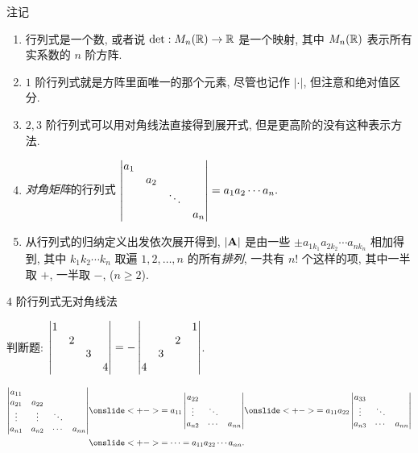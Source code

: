 \begin{frame}{注记}
	\onslide<+->
	\begin{enumerate}
		\item 行列式是一个数, 或者说 $\det:M_n({\mathbb{R}})\to{\mathbb{R}}$ 是一个映射, 其中 $M_n({\mathbb{R}})$ 表示所有实系数的 $n$ 阶方阵.
		\item $1$ 阶行列式就是方阵里面唯一的那个元素, 尽管也记作 $|\cdot|$, 但注意和绝对值区分.
		\item $2,3$ 阶行列式可以用对角线法直接得到展开式, 但是更高阶的没有这种表示方法.
		\item \emph{对角矩阵}的行列式
		$\left|\begin{matrix}
			a_1&&&\\
			&a_2&&\\
			&&\ddots&\\
			&&&a_n
		\end{matrix}\right|=a_1a_2\cdots a_n.$
		\item 从行列式的归纳定义出发依次展开得到, $|{\mathbf{A}}|$ 是由一些 $\pm a_{1 k_1}a_{2 k_2}\cdots a_{n k_n}$ 相加得到, 其中 $k_1 k_2 \cdots k_n$ 取遍 $1,2,\dots,n$ 的所有\emph{排列}, 一共有 $n!$ 个这样的项, 其中一半取 $+$, 一半取 $-$, ($n\ge2$).
	\end{enumerate}
\end{frame}


\begin{frame}{$4$ 阶行列式无对角线法}
	\onslide<+->
	\begin{exercise}
		判断题: $\left|\begin{matrix}1&&&\\&2&&\\&&3&\\&&&4\end{matrix}\right|=-\left|\begin{matrix}&&&1\\&&2&\\&3&&\\4&&&\end{matrix}\right|$. \visible<+->{\Huge\color{red}{$\times$}}
	\end{exercise}
	\onslide<+->
	\begin{example}
		\begin{align*}
			\detm{a_{11}&      &      &\\
			a_{21}&a_{22}&      &\\
			\vdots&\vdots&\ddots&\\
			a_{n1}&a_{n2}&\cdots&a_{nn}}
		&\onslide<+->{=a_{11}\detm{
			a_{22}&      &\\
			\vdots&\ddots&\\
			a_{n2}&\cdots&a_{nn}
		}}
		\onslide<+->{=a_{11}a_{22}\detm{
			a_{33}&      &\\
			\vdots&\ddots&\\
			a_{n3}&\cdots&a_{nn}
		}}\\
		&\onslide<+->{=\cdots=a_{11}a_{22}\cdots a_{nn}.}
		\end{align*}
	\end{example}
\end{frame}


